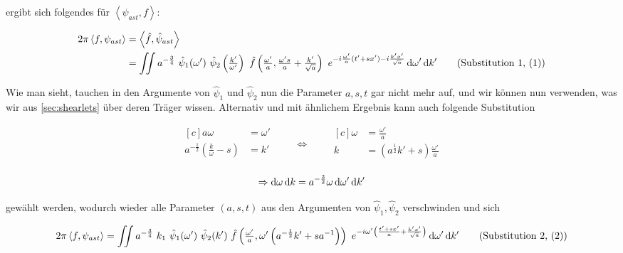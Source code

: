 ergibt sich folgendes für $\left<\psi_{ast}, f\right>$:

\begin{align}
    2 \pi \left\langle f , \psi_{ast}\right\rangle
    &=  \left\langle \hat f, \hat\psi_{ast}\right\rangle \nonumber \\
    &=  \iint a^{-\frac{3}{4}}~\hat \psi_1(\omega') ~\hat \psi_2 \left(\tfrac{k'}{\omega'}\right)
    ~\hat f \left(\tfrac{\omega'}{a}, \tfrac{\omega' s}{a} + \tfrac{k'}{\sqrt{a}}\right)
    ~e^{-i\frac{\omega'}{a}(t'+sx') - i \frac{k' x'}{\sqrt a}}
    \d \omega' \d k'
\refstepcounter{equation}
\tag{Substitution 1, (\theequation)}
\label{eq:substitution1}
\end{align}

Wie man sieht, tauchen in den Argumente von $\hat\psi_1$ und $\hat\psi_2$ nun die Parameter $a,s,t$ gar nicht mehr auf, und wir können nun verwenden, was wir aus \eqref{sec:shearlets} über deren Träger wissen.
Alternativ und mit ähnlichem Ergebnis kann auch folgende Substitution

\begin{equation}
\begin{aligned}[c]
a \omega &= \omega'\\
a^{-\frac{1}{2}} \left(\frac{k}{\omega} - s\right) &= k'\\
\end{aligned}
\qquad\Longleftrightarrow\qquad
\begin{aligned}[c]
\omega &= \frac{\omega'}{a}\\
k &= \left( a^{\frac{1}{2}} k' +s \right) \frac{\omega'}{a}\\
\end{aligned}
\label{eq:substitution2_coords}
\end{equation}

\begin{equation*}
\Rightarrow
\mathop{}\!\mathrm{d} \omega \mathop{}\!\mathrm{d} k = a^{-\frac{3}{2}} \omega \mathop{}\!\mathrm{d} \omega' \mathop{}\!\mathrm{d} k'
\end{equation*}

gewählt werden, wodurch wieder alle Parameter $(a,s,t)$ aus den Argumenten von $\hat\psi_1, \hat\psi_2$
verschwinden und sich

\begin{align}
    2 \pi \left<f, \psi_{ast}\right>
    =  \iint a^{-\frac{3}{4}}~ k_1~ \hat \psi_1(\omega')~ \hat \psi_2 (k')~
    \hat f \left(\tfrac{\omega'}{a}, \omega' \left(a^{-\frac{1}{2}}k' + s a^{-1}\right)\right)
    ~e^{-i \omega' \left(\frac{t'+s x'}{a} + \frac{k' x'}{\sqrt{a}}\right)}
    \d \omega' \d k'
\refstepcounter{equation}
\tag{Substitution 2, (\theequation)}
\label{eq:substitution2}
\end{align}


